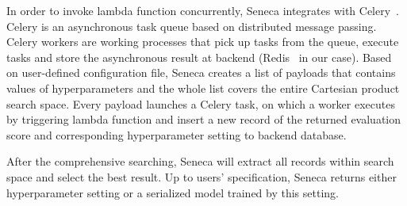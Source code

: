 In order to invoke lambda function concurrently, Seneca integrates with Celery~\cite{ref:celery}. Celery is an asynchronous task queue based on distributed message passing. Celery workers are working processes that pick up tasks from the queue, execute tasks and store the asynchronous result at backend (Redis~\cite{ref:redis} in our case). Based on user-defined configuration file, Seneca creates a list of payloads that contains values of hyperparameters and the whole list covers the entire Cartesian product search space. Every payload launches a Celery task, on which a worker executes by triggering lambda function and insert a new record of the returned evaluation score and corresponding hyperparameter setting to backend database. 

After the comprehensive searching, Seneca will extract all records within search space and select the best result. Up to users' specification, Seneca returns either hyperparameter setting or a serialized model trained by this setting.